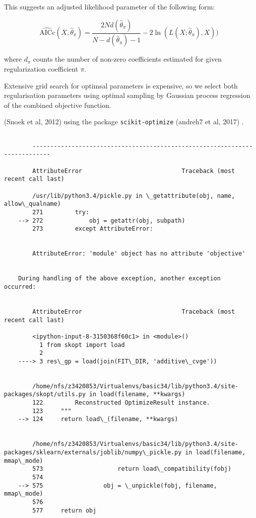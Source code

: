 \documentclass[11pt]{article}
\begin{document}
    This suggests an adjusted likelihood parameter of the following form:

\[
\widehat{\mathrm{AICc}}(X, \hat{\theta}_\pi) = {\frac {2Nd(\hat{\theta}_\pi) }{N-d(\hat{\theta}_\pi)-1}} - 2\ln(L(X;\hat{\theta}_\pi), X))
\]

where $d_\pi$ counts the number of non-zero coefficients estimated for
given regularization coefficient $\pi$.

    Extensive grid search for optimsal parameters is expensive, so we select
both regularisation parameters using optimal sampling by Gaussian
process regression of the combined objective function.

(Snoek et al, 2012) using the package \texttt{scikit-optimize} (andreh7
et al, 2017) .



    \begin{Verbatim}[commandchars=\\\{\}]

        ---------------------------------------------------------------------------

        AttributeError                            Traceback (most recent call last)

        /usr/lib/python3.4/pickle.py in \_getattribute(obj, name, allow\_qualname)
        271         try:
    --> 272             obj = getattr(obj, subpath)
        273         except AttributeError:


        AttributeError: 'module' object has no attribute 'objective'

        
    During handling of the above exception, another exception occurred:


        AttributeError                            Traceback (most recent call last)

        <ipython-input-8-3150368f60c1> in <module>()
          1 from skopt import load
          2 
    ----> 3 res\_gp = load(join(FIT\_DIR, 'additive\_cvge'))
    

        /home/nfs/z3420853/Virtualenvs/basic34/lib/python3.4/site-packages/skopt/utils.py in load(filename, **kwargs)
        122         Reconstructed OptimizeResult instance.
        123     """
    --> 124     return load\_(filename, **kwargs)
    

        /home/nfs/z3420853/Virtualenvs/basic34/lib/python3.4/site-packages/sklearn/externals/joblib/numpy\_pickle.py in load(filename, mmap\_mode)
        573                     return load\_compatibility(fobj)
        574 
    --> 575                 obj = \_unpickle(fobj, filename, mmap\_mode)
        576 
        577     return obj



\end{Verbatim}
\end{document}
